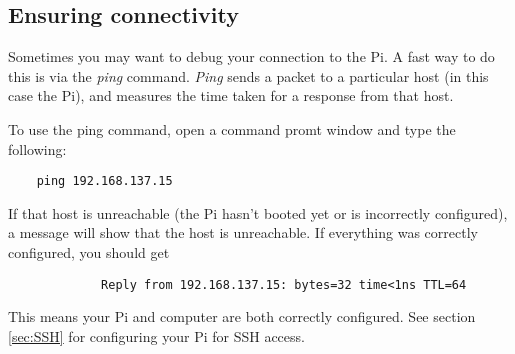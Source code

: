 \subsection{Ensuring connectivity}
\label{sec:Connectivity-EnsuringConnectivity}
Sometimes you may want to debug your connection to the Pi. A fast way to do this is via the \textit{ping} command. \textit{Ping} sends a packet to a particular host (in this case the Pi), and measures the time taken for a response from that host. 

To use the ping command, open a command promt window and type the following:
\begin{verbatim}
    ping 192.168.137.15
\end{verbatim}

If that host is unreachable (the Pi hasn't booted yet or is incorrectly configured), a message will show that the host is unreachable. If everything was correctly configured, you should get
\begin{verbatim}
             Reply from 192.168.137.15: bytes=32 time<1ns TTL=64
\end{verbatim}

This means your Pi and computer are both correctly configured. See section \ref{sec:SSH} for configuring your Pi for SSH access.